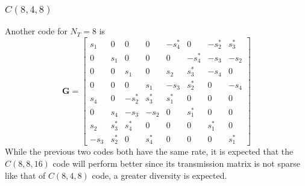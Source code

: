 \subsubsection{$C(8,4,8)$}
Another code for $N_T=8$ is~\cite{larsson03}
\[ \bm{G} = \begin{bmatrix}
  s_1 & 0 & 0 & 0 & -s_4^\ast & 0 & -s_2^\ast & s_3^\ast \\
  0 & s_1 & 0 & 0 & 0 & -s_4^\ast & -s_3 & -s_2 \\
  0 & 0 & s_1 & 0 & s_2 & s_3^\ast & -s_4 & 0 \\
  0 & 0 & 0 & s_1 & -s_3 & s_2^\ast & 0 & -s_4 \\
  s_4 & 0 & -s_2^\ast & s_3^\ast & s_1^\ast & 0 & 0 & 0 \\
  0 & s_4 & -s_3 & -s_2 & 0 & s_1^\ast & 0 & 0 \\
  s_2 & s_3^\ast & s_4^\ast & 0 & 0 & 0 &s_1^\ast & 0 \\
  -s_3 & s_2^\ast & 0 & s_4^\ast & 0 & 0 & 0 & s_1^\ast
\end{bmatrix} \]
While the previous two codes both have the same rate, it is expected that the $C(8,8,16)$ code will perform better since its transmission matrix is not sparse like that of $C(8,4,8)$ code, a greater diversity is expected.


